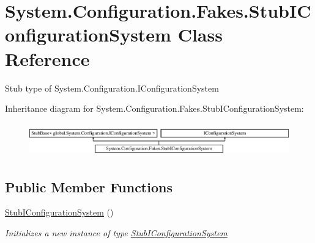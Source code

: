 \hypertarget{class_system_1_1_configuration_1_1_fakes_1_1_stub_i_configuration_system}{\section{System.\-Configuration.\-Fakes.\-Stub\-I\-Configuration\-System Class Reference}
\label{class_system_1_1_configuration_1_1_fakes_1_1_stub_i_configuration_system}
}


Stub type of System.\-Configuration.\-I\-Configuration\-System 


Inheritance diagram for System.\-Configuration.\-Fakes.\-Stub\-I\-Configuration\-System\-:\begin{figure}[H]
\begin{center}
\leavevmode
\includegraphics[height=1.481482cm]{class_system_1_1_configuration_1_1_fakes_1_1_stub_i_configuration_system}
\end{center}
\end{figure}
\subsection*{Public Member Functions}
\begin{DoxyCompactItemize}
\item 
\hyperlink{class_system_1_1_configuration_1_1_fakes_1_1_stub_i_configuration_system_acd819d5bb901dc54e3324653df351083}{Stub\-I\-Configuration\-System} ()
\begin{DoxyCompactList}\small\item\em Initializes a new instance of type \hyperlink{class_system_1_1_configuration_1_1_fakes_1_1_stub_i_configuration_system}{Stub\-I\-Configuration\-System}\end{DoxyCompactList}\end{DoxyCompactItemize}
